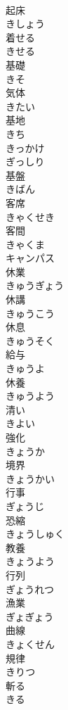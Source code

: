 \documentclass[8pt]{extreport}
\begin{document}
\begin{CJK}{UTF8}{min}
\\	起床 
\\	きしょう	
\\	着せる 
\\	きせる	
\\	基礎 
\\	きそ	
\\	気体 
\\	きたい	
\\	基地 
\\	きち	
\\	きっかけ	
\\	ぎっしり	
\\	基盤 
\\	きばん	
\\	客席 
\\	きゃくせき	
\\	客間 
\\	きゃくま	
\\	キャンパス	
\\	休業 
\\	きゅうぎょう	
\\	休講 
\\	きゅうこう	
\\	休息 
\\	きゅうそく	
\\	給与 
\\	きゅうよ	
\\	休養 
\\	きゅうよう	
\\	清い 
\\	きよい	
\\	強化 
\\	きょうか	
\\	境界 
\\	きょうかい	
\\	行事 
\\	ぎょうじ	
\\	恐縮 
\\	きょうしゅく	
\\	教養 
\\	きょうよう	
\\	行列 
\\	ぎょうれつ	
\\	漁業 
\\	ぎょぎょう	
\\	曲線 
\\	きょくせん	
\\	規律 
\\	きりつ	
\\	斬る 
\\	きる	

\end{CJK}
\end{document}
